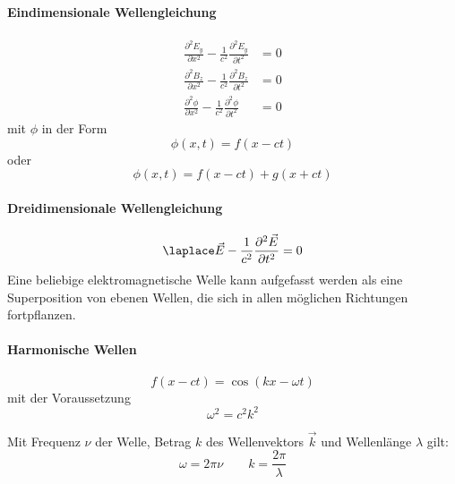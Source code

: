 		\paragraph{Eindimensionale Wellengleichung} %
			\begin{align*}
				\frac{\partial^2 E_y}{\partial x^2} - \frac{1}{c^2} \frac{\partial^2 E_y}{\partial t^2} &= 0 \\
				\frac{\partial^2 B_z}{\partial x^2} - \frac{1}{c^2} \frac{\partial^2 B_z}{\partial t^2} &= 0 \\
				\frac{\partial^2 \phi}{\partial x^2} - \frac{1}{c^2} \frac{\partial^2 \phi}{\partial t^2} &= 0
			\end{align*}
			mit $\phi$ in der Form
			\begin{equation*}
				\phi (x,t)=f(x-ct)
			\end{equation*}
			oder
			\begin{equation*}
				\phi (x,t)=f(x-ct)+g(x+ct)
			\end{equation*}
		\paragraph{Dreidimensionale Wellengleichung} %
			\begin{equation*}
				\laplace \vec E - \frac{1}{c^2} \frac{\partial^2 \vec E}{\partial t^2} = 0
			\end{equation*}
			Eine beliebige elektromagnetische Welle kann aufgefasst werden als eine
			Superposition von ebenen Wellen, die sich in allen möglichen Richtungen
			fortpflanzen.
		\paragraph{Harmonische Wellen} %
			\begin{equation*}
				f(x-ct) = \cos(kx-\omega t)
			\end{equation*}
			mit der Voraussetzung
			\begin{equation*}
				\omega^2 = c^2 k^2
			\end{equation*}
			
			Mit Frequenz $\nu$ der Welle, Betrag $k$ des Wellenvektors $\vec k$ und Wellenlänge $\lambda$ gilt:
			\begin{equation*}
				\omega = 2\pi \nu \qquad k = \frac{2\pi}{\lambda}
			\end{equation*}
			
